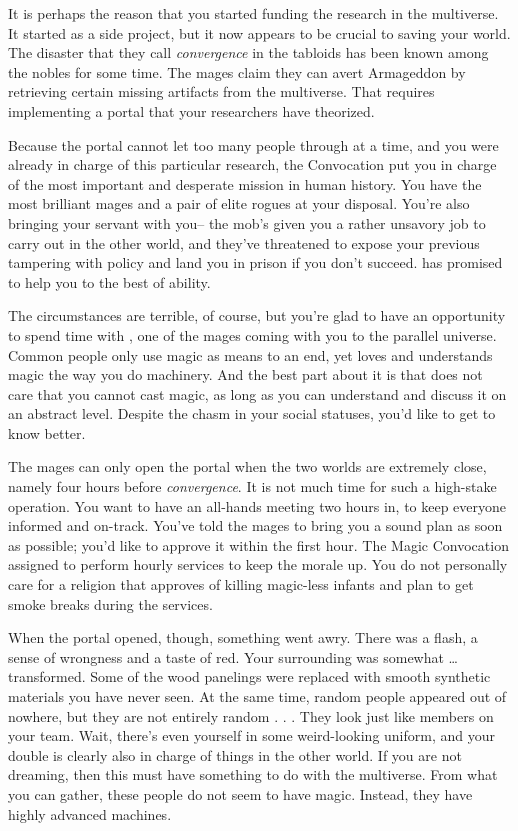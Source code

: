 \documentclass[char]{guildcamp3}
\begin{document}
It is perhaps the reason that you started funding the research in the multiverse. It started as a side project, but it now appears to be crucial to saving your world. The disaster that they call \emph{convergence} in the tabloids has been known among the nobles for some time. The mages claim they can avert Armageddon by retrieving certain missing artifacts from the multiverse. That requires implementing a portal that your researchers have theorized. 

Because the portal cannot let too many people through at a time, and you were already in charge of this particular research, the Convocation put you in charge of the most important and desperate mission in human history. You have the most brilliant mages and a pair of elite rogues at your disposal. You're also bringing your servant with you-- the mob's given you a rather unsavory job to carry out in the other world, and they've threatened to expose your previous tampering with policy and land you in prison if you don't succeed. \cServant{\intro} has promised to help you to the best of \cServant{\their} ability.

The circumstances are terrible, of course, but you're glad to have an opportunity to spend time with \cMageOne{\intro}, one of the mages coming with you to the parallel universe. Common people only use magic as means to an end, yet \cMageOne{} loves and understands magic the way you do machinery. And the best part about it is that  does not care that you cannot cast magic, as long as you can understand and discuss it on an abstract level. Despite the chasm in your social statuses, you'd like to get to know \cMageOne{\them} better. 

The mages can only open the portal when the two worlds are extremely close, namely four hours before \emph{convergence}. It is not much time for such a high-stake operation. You want to have an all-hands meeting two hours in, to keep everyone informed and on-track. You've told the mages to bring you a sound plan as soon as possible; you'd like to approve it within the first hour. The Magic Convocation assigned \cPaladin{} to perform hourly services to keep the morale up. You do not personally care for a religion that approves of killing magic-less infants and plan to get smoke breaks during the services.

When the portal opened, though, something went awry. There was a flash, a sense of wrongness and a taste of red. Your surrounding was somewhat \ldots transformed. Some of the wood panelings were replaced with smooth synthetic materials you have never seen. At the same time, random people appeared out of nowhere, but they are not entirely random . . . They look just like members on your team. Wait, there's even yourself in some weird-looking uniform, and your double is clearly also in charge of things in the other world. If you are not dreaming, then this must have something to do with the multiverse. From what you can gather, these people do not seem to have magic. Instead, they have highly advanced machines.
\end{document}
